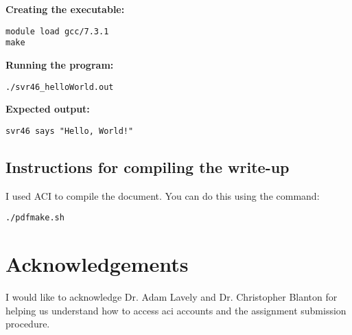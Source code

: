 \documentclass{article}
\begin{document}
\begin{spacing}{1.1}
\textbf{Creating the executable:}
\begin{verbatim}
module load gcc/7.3.1
make
\end{verbatim}

\textbf{Running the program:}
\begin{verbatim}
./svr46_helloWorld.out
\end{verbatim}

\textbf{Expected output:}
\begin{verbatim}
svr46 says "Hello, World!"
\end{verbatim}

\subsection{Instructions for compiling the write-up}

I used ACI to compile the document.  You can do this using the command:
\begin{verbatim}
./pdfmake.sh
\end{verbatim}

\section{Acknowledgements}

I would like to acknowledge Dr. Adam Lavely and Dr. Christopher Blanton for helping us understand how to access aci accounts and the assignment submission procedure.




\end{spacing}
\end{document}
